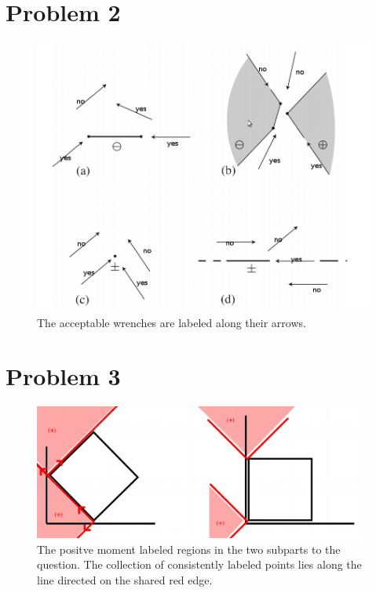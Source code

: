 \documentclass[letterpaper,10pt]{article} %
\begin{document}
\newpage

\section*{Problem 2}

\begin{figure}[h]
\centering
\includegraphics[width=\textwidth]{p2}
\caption{The acceptable wrenches are labeled along their arrows.}
\label{fig:p2}
\end{figure}

\newpage

\section*{Problem 3}

\begin{figure}[h]
\centering
\includegraphics[width=\textwidth]{p3plus}
\caption{The positve moment labeled regions in the two subparts to the question. The collection of consistently labeled points lies along the line directed on the shared red edge.}
\label{fig:p3a}
\end{figure}
\end{document}
